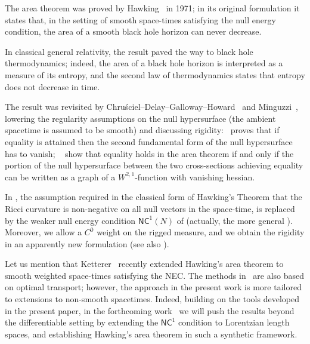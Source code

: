 \documentclass[12pt,a4paper]{amsart}
\theoremstyle{plain}
\theoremstyle{definition}
\numberwithin{equation}{section}
\newcommand{\NC}{\mathsf{NC}}
\begin{document}
The area theorem was proved by Hawking~\cite{Haw71} in 1971; in its original formulation it states that, in the setting of smooth space-times satisfying the null energy condition, the area of a smooth black hole horizon can never decrease.

In classical general relativity, the result paved the way to black hole thermodynamics; indeed, the area of a black hole horizon is interpreted as a measure of its entropy, and the second law of thermodynamics states that entropy does not decrease in time.

The result was revisited  by  Chru{\'s}ciel--Delay--Galloway--Howard~\cite{CDGH-AHP-2001} and Minguzzi~\cite{MinguzziCMP15}, lowering the regularity assumptions on the null hypersurface (the ambient spacetime is assumed to be smooth) and discussing rigidity:~\cite{CDGH-AHP-2001} proves that if equality is attained then the second fundamental form of the null hypersurface has to vanish; ~\cite[Th.~12,~Th.~13]{MinguzziCMP15} show that equality holds in the area theorem if and only if the portion of the null hypersurface between the two cross-sections achieving equality can be written as a graph of a $W^{2,1}$-function with vanishing hessian.



In , the assumption required in the classical form of Hawking's Theorem that the Ricci curvature is non-negative on all null vectors in the space-time, is replaced by the weaker null energy condition  $\NC^1(N)$ of  (actually, the more general ). Moreover, we allow a $C^0$ weight on the rigged measure, and  we obtain the rigidity in an apparently new formulation (see also ).


Let us mention that Ketterer~\cite{Ket24} recently extended Hawking's area theorem to smooth weighted space-times satisfying the NEC. The methods in~\cite{Ket24} are also based on optimal transport; however, the approach in the present work is more tailored to extensions to non-smooth spacetimes.  Indeed, building on the tools developed in the present paper, in the forthcoming work~\cite{CMM24b} we will push the results beyond the differentiable setting by extending the $\NC^1$ condition to Lorentzian length spaces, and establishing Hawking's area theorem in such a synthetic framework.  
\end{document}
